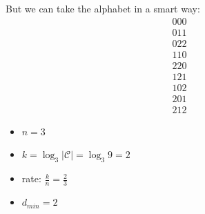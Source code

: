     
But we can take the alphabet in a smart way:
    \begin{align*} 000\\011\\022\\110\\220\\121\\102\\201\\212 \end{align*}
     \begin{itemize}
        \item $n = 3$
        \item $k = \log_3 \left|\mathcal{C}\right| = \log_3 9 = 2$
        \item rate: $\frac{k}{n} = \frac{2}{3}$
        \item $d_{min} = 2$
    \end{itemize}


